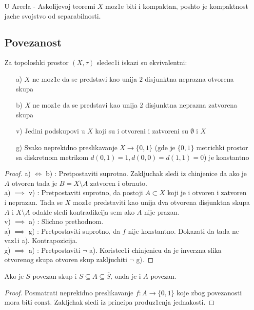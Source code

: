 \documentclass[a4paper,12pt]{article}
\newcommand{\psj}{\subseteq}
\newcommand{\const}{\mathrm{const}}
\begin{document}
\begin{nap}
U Arcela - Askolijevoj teoremi $X$ moz1e biti i kompaktan, poshto je kompaktnost jache svojstvo od separabilnosti.
\end{nap}
\subsection{Povezanost}

\begin{tma}
Za topoloshki prostor $(X, \tau)$ sledec1i iskazi su ekvivalentni:
\begin{itemize}
\item[a)] $X$ ne moz1e da se predstavi kao unija $2$ disjunktna neprazna otvorena skupa
\item[b)]  $X$ ne moz1e da se predstavi kao unija $2$ disjunktna neprazna zatvorena skupa
\item[v)] Jedini podskupovi u $X$ koji su i otvoreni i zatvoreni su $\emptyset$ i $X$
\item[g)] Svako neprekidno preslikavanje $X \to \{0,1\}$ (gde je $\{0,1\}$ metrichki prostor sa diskretnom metrikom $d(0,1) = 1, d(0,0) = d(1,1) = 0$) je konstantno
\end{itemize}
\end{tma}

\begin{proof}
a) $\Leftrightarrow$ b) : Pretpostaviti suprotno. Zakljuchak sledi iz chinjenice da ako je $A$ otvoren tada je $B = X \setminus A$ zatvoren i obrnuto. \\ 
a) $\implies$ v) : Pretpostaviti suprotno, da postoji $A \subset X$ koji je i otvoren i zatvoren i neprazan. Tada se $X$ moz1e predstaviti kao unija dva otvorena disjunktna skupa $A$ i $X \setminus A$ odakle sledi kontradikcija sem ako $A$ nije prazan.
\\ 
v) $\implies$ a) : Slichno prethodnom.
\\
a) $\implies$ g) : Pretpostaviti suprotno, da $f$ nije konstantno. Dokazati da tada ne vaz1i a). Kontrapozicija.
\\
g) $\implies$ a) : Pretpostaviti $\neg$ a). Koristec1i chinjenicu da je inverzna slika otvorenog skupa otvoren skup zakljuchiti $\neg$ g).
\end{proof}

\begin{tvr}
Ako je $S$ povezan skup i $S \psj A \psj \overline{S}$, onda je i $A$ povezan.
\end{tvr}
\begin{proof}
Posmatrati neprekidno preslikavanje $f: A \to \{0, 1\}$ koje zbog povezanosti mora biti $\const$. Zakljchak sledi iz principa produz1enja jednakosti.
\end{proof}
\end{document}
